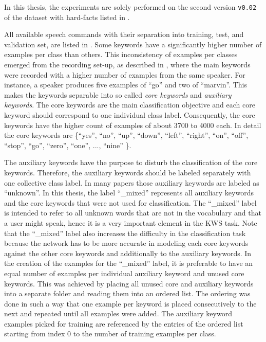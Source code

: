 In this thesis, the experiments are solely performed on the second version \texttt{v0.02} of the dataset with hard-facts listed in .

All available speech commands with their separation into training, test, and validation set, are listed in .
Some keywords have a significantly higher number of examples per class than others.
This inconsistency of examples per classes emerged from the recording set-up, as described in \cite{Warden2018}, where the main keywords were recorded with a higher number of examples from the same speaker.
For instance, a speaker produces five examples of \enquote{go} and two of \enquote{marvin}.
This makes the keywords separable into so called \emph{core keywords} and \emph{auxiliary keywords}.
The core keywords are the main classification objective and each core keyword should correspond to one individual class label.
Consequently, the core keywords have the higher count of examples of about 3700 to 4000 each.
In detail the core keywords are \{\enquote{yes}, \enquote{no}, \enquote{up}, \enquote{down}, \enquote{left}, \enquote{right}, \enquote{on}, \enquote{off}, \enquote{stop}, \enquote{go}, \enquote{zero}, \enquote{one}, ..., \enquote{nine} \}.

The auxiliary keywords have the purpose to disturb the classification of the core keywords.
Therefore, the auxiliary keywords should be labeled separately with one collective class label.
In many papers those auxiliary keywords are labeled as \enquote{unknown}.
In this thesis, the label \enquote{\_mixed} represents all auxiliary keywords and the core keywords that were not used for classification.
The \enquote{\_mixed} label is intended to refer to all unknown words that are not in the vocabulary and that a user might speak, hence it is a very important element in the KWS task.
Note that the \enquote{\_mixed} label also increases the difficulty in the classification task because the network has to be more accurate in modeling each core keywords against the other core keywords and additionally to the auxiliary keywords.
In the creation of the examples for the \enquote{\_mixed} label, it is preferable to have an equal number of examples per individual auxiliary keyword and unused core keywords.
This was achieved by placing all unused core and auxiliary keywords into a separate folder and reading them into an ordered list.
The ordering was done in such a way that one example per keyword is placed consecutively to the next and repeated until all examples were added.
The auxiliary keyword examples picked for training are referenced by the entries of the ordered list starting from index 0 to the number of training examples per class.

